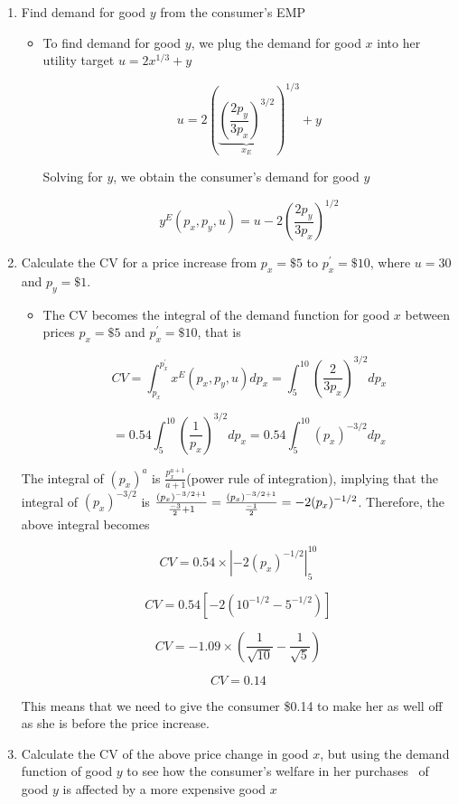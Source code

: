 \documentclass{article}
\begin{document}
\begin{enumerate}
\item Find demand for good $y$ from the consumer's EMP

\begin{itemize}
\item To find demand for good $y$, we plug the demand for good $x$ into her
utility target $u=2x^{1/3}+y$

\[
u=2\left( \underset{x_{E}}{\underbrace{\left( \frac{2p_{y}}{3p_{x}}\right)
^{3/2}}}\right) ^{1/3}+y
\]

Solving for $y$, we obtain the consumer's demand for good $y$

\[
y^{E}(p_{x},p_{y},u)=u-2\left( \frac{2p_{y}}{3p_{x}}\right) ^{1/2}
\]
\end{itemize}

\item Calculate the CV for a price increase from $p_{x}=\$5$ to $%
p_{x}^{\prime }=\$10$, where $u=30$ and $p_{y}=\$1.$

\begin{itemize}
\item The CV becomes the integral of the demand function for good $x$
between prices $p_{x}=\$5$ and $p_{x}^{\prime }=\$10$, that is 

\[
CV=\int_{p_{x}}^{p_{x}^{\prime
}}x^{E}(p_{x},p_{y},u)dp_{x}=\int_{5}^{10}\left( \frac{2}{3p_{x}}\right)
^{3/2}dp_{x}
\]

\[
=0.54\int_{5}^{10}\left( \frac{1}{p_{x}}\right)
^{3/2}dp_{x}=0.54\int_{5}^{10}\left( p_{x}\right) ^{-3/2}dp_{x}
\]
\end{itemize}

The integral of $(p_{x})^{a}$ is $\frac{p_{x}^{a+1}}{a+1}$(power rule of
integration), implying that the integral of $(p_{x})^{-3/2}$ is $\frac{%
(p_{x})^{-3/2+1}}{\frac{-3}{2}+1}=\frac{(p_{x})^{-3/2+1}}{\frac{-1}{2}}%
=-2(p_{x})^{-1/2}$. Therefore, the above integral becomes

\[
CV=0.54\times |-2(p_{x})^{-1/2}|_{5}^{10}
\]

\[
CV=0.54\left[ -2(10^{-1/2}-5^{-1/2})\right] 
\]

\[
CV=-1.09\times \left( \frac{1}{\sqrt{10}}-\frac{1}{\sqrt{5}}\right) 
\]

\[
CV=0.14
\]

This means that we need to give the consumer \$0.14 to make her as well off
as she is before the price increase.

\item Calculate the CV of the above price change in good $x$, but using the
demand function of good $y$ to see how the consumer's welfare in her
purchases \ of good $y$ is affected by a more expensive good $x$


\end{enumerate}
\end{document}
